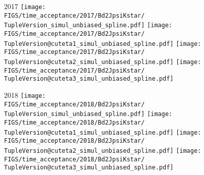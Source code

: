 \begin{frame}
  2017
  \texttt{[image: \\FIGS/time\_acceptance/2017/Bd2JpsiKstar/\\TupleVersion\_simul\_unbiased\_spline.pdf]}
  \texttt{[image: \\FIGS/time\_acceptance/2017/Bd2JpsiKstar/\\TupleVersion@cuteta1\_simul\_unbiased\_spline.pdf]}
  \texttt{[image: \\FIGS/time\_acceptance/2017/Bd2JpsiKstar/\\TupleVersion@cuteta2\_simul\_unbiased\_spline.pdf]}
  \texttt{[image: \\FIGS/time\_acceptance/2017/Bd2JpsiKstar/\\TupleVersion@cuteta3\_simul\_unbiased\_spline.pdf]}
  \vspace*{2mm}

  2018
  \texttt{[image: \\FIGS/time\_acceptance/2018/Bd2JpsiKstar/\\TupleVersion\_simul\_unbiased\_spline.pdf]}
  \texttt{[image: \\FIGS/time\_acceptance/2018/Bd2JpsiKstar/\\TupleVersion@cuteta1\_simul\_unbiased\_spline.pdf]}
  \texttt{[image: \\FIGS/time\_acceptance/2018/Bd2JpsiKstar/\\TupleVersion@cuteta2\_simul\_unbiased\_spline.pdf]}
  \texttt{[image: \\FIGS/time\_acceptance/2018/Bd2JpsiKstar/\\TupleVersion@cuteta3\_simul\_unbiased\_spline.pdf]}

\end{frame} %






